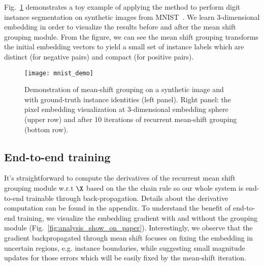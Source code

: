 Fig.~\ref{fig:mnist_demo} demonstrates a toy example of applying the method to
perform digit instance segmentation on synthetic images from
MNIST~\cite{lecun1998gradient}. We learn 3-dimensional embedding in order to
visualize the results before and after the mean shift grouping module.  From
the figure, we can see the mean shift grouping transforms the initial embedding
vectors to yield a small set of instance labels which are distinct (for negative
pairs) and compact (for positive pairs).

\begin{figure}[t]
\centering
   \texttt{[image: mnist\_demo]}
   \vspace{-2mm}
   \caption{Demonstration of mean-shift grouping on a synthetic image and with
   ground-truth instance identities (left panel).  Right panel: the pixel
   embedding visualization at 3-dimensional embedding sphere (upper row) and
   after 10 iterations of recurrent mean-shift grouping (bottom row).
   }
   \vspace{-3mm}
\label{fig:mnist_demo}
\end{figure}


\subsection{End-to-end training}
It's straightforward to compute the derivatives of the recurrent mean shift
grouping module w.r.t $\X$ based on the the chain rule so our whole system is
end-to-end trainable through back-propagation.  Details about the derivative
computation can be found in the appendix.  To understand the benefit
of end-to-end training, we visualize the embedding gradient with and without
the grouping module (Fig.~\ref{fig:analysis_show_on_paper}).  Interestingly, we
observe that the gradient backpropagated through mean shift focuses on fixing
the embedding in uncertain regions, e.g.  instance boundaries, while suggesting
small magnitude updates for those errors which will be easily fixed by the
mean-shift iteration.

